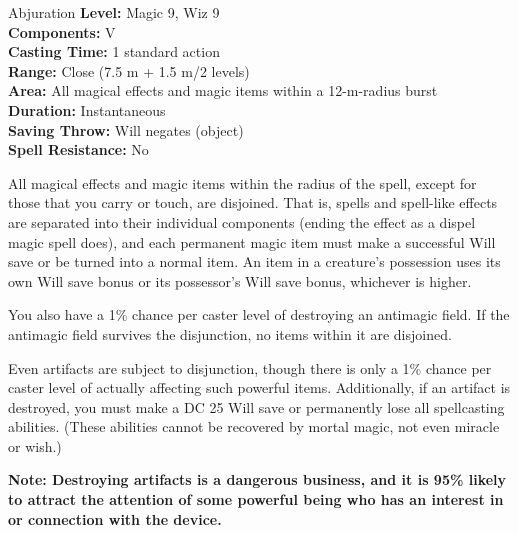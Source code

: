 {Abjuration}
{
	\textbf{Level:}
	Magic 9, Wiz 9\\
	\textbf{Components:}
	V\\
	\textbf{Casting Time:}
	1 standard action\\
	\textbf{Range:}
	Close (7.5 m + 1.5 m/2 levels)\\
	\textbf{Area:}
	All magical effects and magic items within a 12-m-radius burst\\
	\textbf{Duration:}
	Instantaneous\\
	\textbf{Saving Throw:}
	Will negates (object)\\
	\textbf{Spell Resistance:}
	No\\
}
{
	All magical effects and magic items within the radius of the spell, except for those that you carry or touch, are disjoined. That is, spells and spell-like effects are separated into their individual components (ending the effect as a dispel magic spell does), and each permanent magic item must make a successful Will save or be turned into a normal item. An item in a creature's possession uses its own Will save bonus or its possessor's Will save bonus, whichever is higher.

	You also have a 1\% chance per caster level of destroying an antimagic field. If the antimagic field survives the disjunction, no items within it are disjoined.

	Even artifacts are subject to disjunction, though there is only a 1\% chance per caster level of actually affecting such powerful items. Additionally, if an artifact is destroyed, you must make a DC 25 Will save or permanently lose all spellcasting abilities. (These abilities cannot be recovered by mortal magic, not even miracle or wish.)

	\textbf{Note: Destroying artifacts is a dangerous business, and it is 95\% likely to attract the attention of some powerful being who has an interest in or connection with the device.}

}

